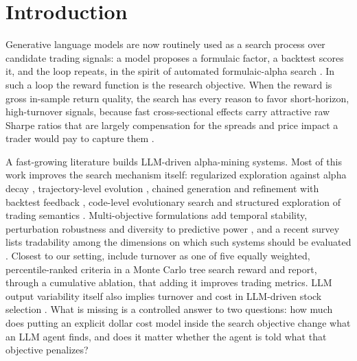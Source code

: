 \documentclass[preprint,12pt,authoryear]{elsarticle}
\begin{document}
\section{Introduction}\label{sec:intro}

Generative language models are now routinely used as a search process over candidate trading signals: a model proposes a formulaic factor, a backtest scores it, and the loop repeats, in the spirit of automated formulaic-alpha search \citep{kakushadze2016}. In such a loop the reward function is the research objective. When the reward is gross in-sample return quality, the search has every reason to favor short-horizon, high-turnover signals, because fast cross-sectional effects carry attractive raw Sharpe ratios that are largely compensation for the spreads and price impact a trader would pay to capture them \citep{korajczyk2004,novymarx2016}.

A fast-growing literature builds LLM-driven alpha-mining systems. Most of this work improves the search mechanism itself: regularized exploration against alpha decay \citep{tang2025}, trajectory-level evolution \citep{han2026}, chained generation and refinement with backtest feedback \citep{cao2025}, code-level evolutionary search \citep{liu2026} and structured exploration of trading semantics \citep{yi2026}. Multi-objective formulations add temporal stability, perturbation robustness and diversity to predictive power \citep{zhao2026}, and a recent survey lists tradability among the dimensions on which such systems should be evaluated \citep{yu2026}. Closest to our setting, \citet{shi2026} include turnover as one of five equally weighted, percentile-ranked criteria in a Monte Carlo tree search reward and report, through a cumulative ablation, that adding it improves trading metrics. LLM output variability itself also implies turnover and cost in LLM-driven stock selection \citep{chon2025}. What is missing is a controlled answer to two questions: how much does putting an explicit dollar cost model inside the search objective change what an LLM agent finds, and does it matter whether the agent is told what that objective penalizes?
\end{document}
